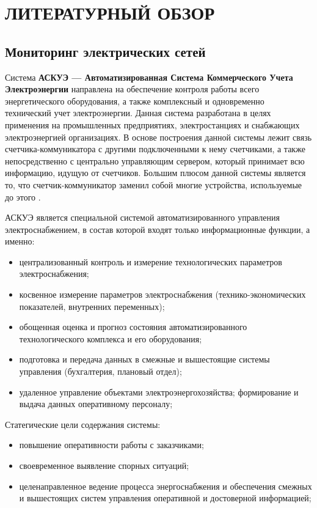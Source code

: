 \chapter{ЛИТЕРАТУРНЫЙ ОБЗОР}

\section{Мониторинг электрических сетей}

Система \textbf{АСКУЭ --- Автоматизированная Система Коммерческого Учета Электроэнергии} направлена на обеспечение контроля работы всего энергетического оборудования, а также комплексный и одновременно технический учет электроэнергии. Данная система разработана в целях применения на промышленных предприятиях, электростанциях и снабжающих электроэнергией организациях. В основе построения данной системы лежит связь счетчика-коммуникатора с другими подключенными к нему счетчиками, а также непосредственно с центрально управляющим сервером, который принимает всю информацию, идущую от счетчиков. Большим плюсом данной системы является то, что счетчик-коммуникатор заменил собой многие устройства, используемые до этого \cite{ascaepinfo}.

АСКУЭ является специальной системой автоматизированного управления электроснабжением, в состав которой входят только информационные функции, а именно:
\begin{itemize}
\item централизованный контроль и измерение технологических параметров электроснабжения;
\item косвенное измерение параметров электроснабжения (технико-экономических показателей, внутренних переменных);
\item обощенная оценка и прогноз состояния автоматизированного технологического комплекса и его оборудования;
\item подготовка и передача данных в смежные и вышестоящие системы управления (бухгалтерия, плановый отдел);
\item удаленное управление объектами электроэнергохозяйства; формирование и выдача
данных оперативному персоналу;
\end{itemize}

Статегические цели содержания системы:
\begin{itemize}
\item повышение оперативности работы с заказчиками;
\item своевременное выявление спорных ситуаций;
\item целенаправленное ведение процесса энергоснабжения и обеспечения смежных и вышестоящих систем управления оперативной и достоверной информацией;
\end{itemize}

